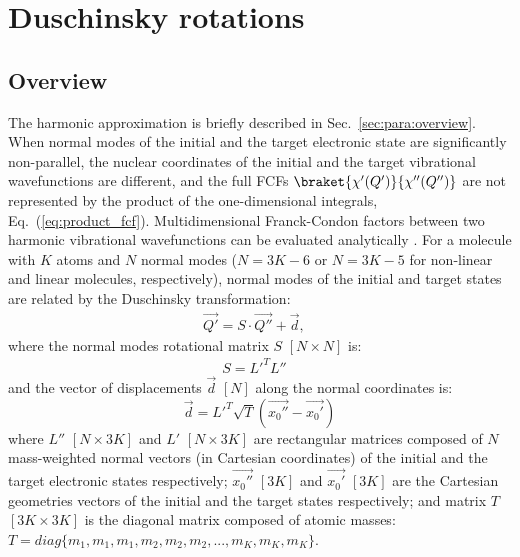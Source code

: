 \documentclass[11pt]{article}
\begin{document}
\section{Duschinsky rotations}
\label{sec:dushinsky}

\subsection{Overview}
\label{sec:dhush:overview}

The harmonic approximation is briefly described in Sec.~\ref{sec:para:overview}.
When normal modes of the initial and the target electronic state are significantly non-parallel,
the nuclear coordinates of the initial and the target vibrational wavefunctions are different,
and the full FCFs $\braket{\chi '(Q')}{\chi'' (Q'')}$ 
are not represented by the product of the one-dimensional integrals, Eq.~(\ref{eq:product_fcf}).
Multidimensional Franck-Condon factors between two harmonic vibrational wavefunctions
can be evaluated analytically \cite{Kupka:FC:86,Duschinsky:math:98}.
For a molecule with $K$ atoms and $N$ normal modes 
($N=3K-6$ or $N=3K-5$ for non-linear and linear molecules, respectively),
normal modes of the initial and target states are related by the Duschinsky transformation\cite{Duschinky:37}:
\begin{align}
\overrightarrow{Q'}=S\cdot\overrightarrow{Q''}+\overrightarrow{d},&
\label{eq:dushinsky}
\end{align}
where the normal modes rotational matrix $S$ $[N\times N]$ is:
\begin{align}
S=L'^TL''&\nonumber
\end{align}
and the vector of displacements $\overrightarrow{d}$ $[N]$ along the normal coordinates is:
\begin{equation}
\label{eq:displacement_vec}
\overrightarrow{d}=L'^T\sqrt{T}(\overrightarrow{x_0''}-\overrightarrow{x_0'})
\end{equation}
where $L''$ $[N\times 3K]$ and $L'$ $[N\times 3K]$ are rectangular matrices composed of $N$ mass-weighted normal vectors
(in Cartesian coordinates) of the initial and the target electronic states respectively;
$\overrightarrow{x_0''}$ $[3K]$ and $\overrightarrow{x_0'}$ $[3K]$ are the Cartesian geometries vectors
of the initial and the target states respectively; and matrix $T$ $[3K\times 3K]$ 
is the diagonal matrix composed of atomic masses: $T=diag\{m_1,m_1,m_1,m_2,m_2,m_2,...,m_K,m_K,m_K\}$.
\end{document}
